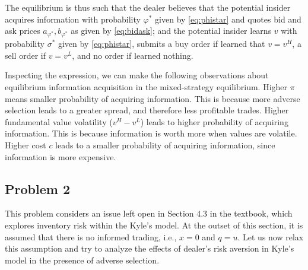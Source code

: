 \documentclass[11pt
, answers
]{exam}
\begin{document}
\begin{enumerate} [label=(\alph*). ]
\begin{solution}
	The equilibrium is thus such that the dealer believes that the potential insider acquires information with probability $\varphi^*$ given by \eqref{eq:phistar} and quotes bid and ask prices $a_{\varphi^*}, b_{\varphi^*}$ as given by \eqref{eq:bidask}; and the potential insider learns $v$ with probability $\sigma^*$ given by \eqref{eq:phistar}, submits a buy order if learned that $v = v^H$, a sell order if $v = v^L$, and no order if learned nothing.

	Inspecting the expression, we can make the following observations about equilibrium information acquisition in the mixed-strategy equilibrium. Higher $\pi$ means smaller probability of acquiring information. This is because more adverse selection leads to a greater spread, and therefore less profitable trades. Higher fundamental value volatility ($v^H-v^L$) leads to higher probability of acquiring information. This is because information is worth more when values are volatile. Higher cost $c$ leads to a smaller probability of acquiring information, since information is more expensive.
\end{solution}


%
%  
%  

\end{enumerate}



\qquad
\subsection*{Problem 2}


This problem considers an issue left open in Section 4.3 in the textbook, which explores inventory risk within the Kyle's model. At the outset of this section, it is assumed that there is no informed trading, i.e., $x = 0$ and $q = u$. Let us now relax this assumption and try to analyze the effects of dealer's risk aversion in Kyle's model in the presence of adverse selection.
\end{document}
